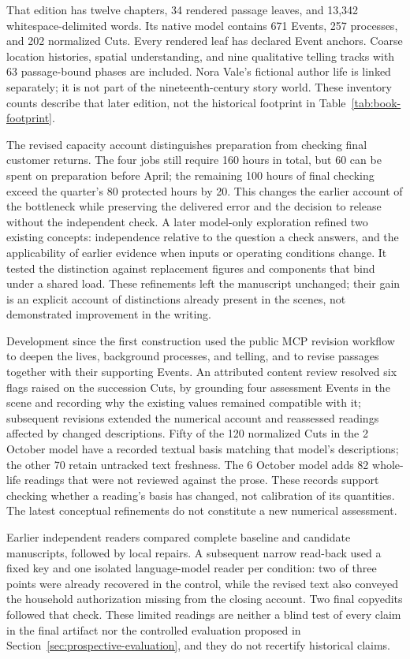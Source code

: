 \documentclass[11pt,a4paper]{article}
\begin{document}
That edition has twelve chapters, 34 rendered passage leaves, and 13,342
whitespace-delimited words. Its native model contains 671 Events, 257 processes,
and 202 normalized Cuts. Every rendered leaf has declared Event anchors. Coarse location
histories, spatial understanding, and nine qualitative telling tracks with
63 passage-bound phases are included. Nora Vale's fictional author life is
linked separately; it is not part of the nineteenth-century story world.
These inventory counts describe that later edition, not the historical
footprint in Table~\ref{tab:book-footprint}.

The revised capacity account distinguishes preparation from checking final
customer returns. The four jobs still require 160 hours in total, but 60 can
be spent on preparation before April; the remaining 100 hours of final
checking exceed the quarter's 80 protected hours by 20. This changes the
earlier account of the bottleneck while preserving the delivered error and
the decision to release without the independent check. A later model-only
exploration refined two existing concepts: independence relative to the
question a check answers, and the applicability of earlier evidence when
inputs or operating conditions change. It tested the distinction against
replacement figures and components that bind under a shared load. These
refinements left the manuscript unchanged; their gain is an explicit account
of distinctions already present in the scenes, not demonstrated improvement
in the writing.

Development since the first construction used the public MCP revision workflow to deepen the lives,
background processes, and telling, and to revise passages together with their
supporting Events. An attributed content review resolved six flags raised on the succession Cuts,
by grounding four assessment Events in the scene and recording why the existing
values remained compatible with it; subsequent revisions extended the numerical
account and reassessed readings affected by changed descriptions. Fifty of the
120 normalized Cuts in the 2 October model have a recorded textual basis matching
that model's descriptions; the other 70 retain untracked text freshness. The 6 October model adds 82
whole-life readings that were not reviewed against the prose. These
records support checking whether a reading's basis has changed, not calibration
of its quantities. The latest conceptual refinements do not constitute a new
numerical assessment.

Earlier independent readers compared complete baseline and candidate manuscripts,
followed by local repairs. A subsequent narrow read-back used a fixed key and
one isolated language-model reader per condition: two of three points were
already recovered in the control, while the revised text also conveyed the
household authorization missing from the closing account. Two final copyedits
followed that check. These limited readings are neither a blind test of every
claim in the final artifact nor the controlled evaluation proposed in Section~\ref{sec:prospective-evaluation}, and
they do not recertify historical claims.
\end{document}

